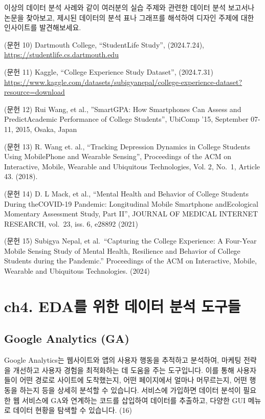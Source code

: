 \documentclass[
  letterpaper,
]{book}
\begin{document}
이상의 데이터 분석 사례와 같이 여러분의 실습 주제와 관련한 데이터 분석
보고서나 논문을 찾아보고, 제시된 데이터의 분석 표나 그래프를 해석하여
디자인 주제에 대한 인사이트를 발견해보세요.

(문헌 10) Dartmouth College, ``StudentLife Study'', (2024.7.24),
\href{https://studentlife.cs.dartmouth.edu/}{https://studentlife.cs.dartmouth.edu}

(문헌 11) Kaggle, ``College Experience Study Dataset'', (2024.7.31)
\url{https://www.kaggle.com/datasets/subigyanepal/college-experience-dataset?resource=download}

(문헌 12) Rui Wang, et al., ''SmartGPA: How Smartphones Can Assess and
PredictAcademic Performance of College Students'', UbiComp '15,
September 07-11, 2015, Osaka, Japan

(문헌 13) R. Wang et. al., ``Tracking Depression Dynamics in College
Students Using MobilePhone and Wearable Sensing'', Proceedings of the
ACM on Interactive, Mobile, Wearable and Ubiquitous Technologies, Vol.
2, No.~1, Article 43. (2018).

(문헌 14) D. L Mack, et al., ``Mental Health and Behavior of College
Students During theCOVID-19 Pandemic: Longitudinal Mobile Smartphone
andEcological Momentary Assessment Study, Part II'', JOURNAL OF MEDICAL
INTERNET RESEARCH, vol.~23, iss. 6, e28892 (2021)

(문헌 15) Subigya Nepal, et al.~``Capturing the College Experience: A
Four-Year Mobile Sensing Study of Mental Health, Resilience and Behavior
of College Students during the Pandemic.'' Proceedings of the ACM on
Interactive, Mobile, Wearable and Ubiquitous Technologies. (2024)

\chapter{ch4. EDA를 위한 데이터 분석
도구들}\label{ch4.-edauxb97c-uxc704uxd55c-uxb370uxc774uxd130-uxbd84uxc11d-uxb3c4uxad6cuxb4e4}

\section{Google Analytics (GA)}\label{google-analytics-ga}

Google Analytics는 웹사이트와 앱의 사용자 행동을 추적하고 분석하여,
마케팅 전략을 개선하고 사용자 경험을 최적화하는 데 도움을 주는
도구입니다. 이를 통해 사용자들이 어떤 경로로 사이트에 도착했는지, 어떤
페이지에서 얼마나 머무르는지, 어떤 행동을 하는지 등을 상세히 분석할 수
있습니다. 서비스에 가입하면 데이터 분석이 필요한 웹 서비스에 GA와
연계하는 코드를 삽입하여 데이터를 추출하고, 다양한 GUI 메뉴로 데이터
현황을 탐색할 수 있습니다. (16)
\end{document}
